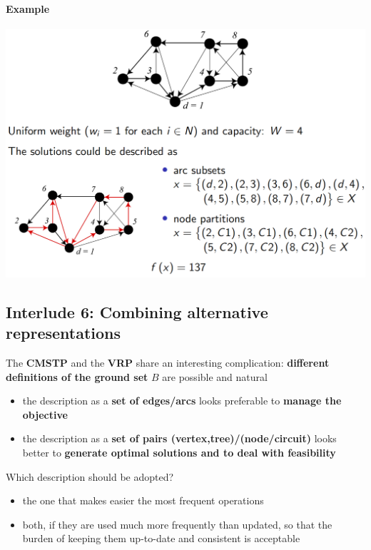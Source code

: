 \documentclass[11pt]{article}
\begin{document}
	\paragraph{Example}
	\begin{center}
		\includegraphics[width=0.9\columnwidth]{img/VRP1}
	\end{center}
	
	\newpage
	
	\subsection*{Interlude 6: Combining alternative representations}
	The \textbf{CMSTP} and the \textbf{VRP} share an interesting complication: \textbf{different definitions of the ground set} $B$ are possible and natural
	\begin{itemize}
		\item the description as a \textbf{set of edges/arcs} looks preferable to \textbf{manage the objective}
		\item the description as a \textbf{set of pairs (vertex,tree)/(node/circuit)} looks better to \textbf{generate optimal solutions and to deal with feasibility}
	\end{itemize}
	
	Which description should be adopted?
	\begin{itemize}
		\item the one that makes easier the most frequent operations
		\item both, if they are used much more frequently than updated, so that the burden of keeping them up-to-date and consistent is acceptable
	\end{itemize}
	
\end{document}
